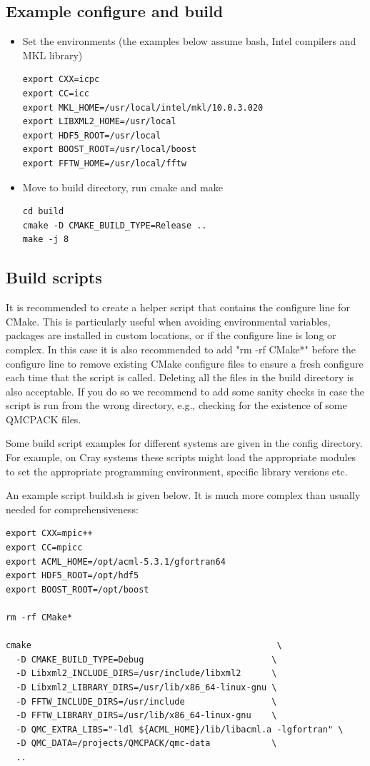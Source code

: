 \subsection{Example configure and build}
\begin{itemize}
\item Set the environments (the examples below assume bash, Intel compilers and MKL library)
\begin{verbatim}
export CXX=icpc
export CC=icc
export MKL_HOME=/usr/local/intel/mkl/10.0.3.020
export LIBXML2_HOME=/usr/local
export HDF5_ROOT=/usr/local
export BOOST_ROOT=/usr/local/boost
export FFTW_HOME=/usr/local/fftw
\end{verbatim}

\item Move to build directory, run cmake and make
\begin{verbatim}
cd build
cmake -D CMAKE_BUILD_TYPE=Release ..
make -j 8
\end{verbatim}
\end{itemize}

\subsection{Build scripts}
It is recommended to create a helper script that contains the
configure line for CMake.  This is particularly useful when avoiding
environmental variables, packages are installed in custom locations,
or if the configure line is long or complex.  In this case it is also
recommended to add "rm -rf CMake*" before the configure line to remove
existing CMake configure files to ensure a fresh configure each time
that the script is called. Deleting all the files in the build
directory is also acceptable. If you do so we recommend to add some sanity
checks in case the script is run from the wrong directory, e.g.,
checking for the existence of some QMCPACK files.

Some build script examples for different systems are given in the
config directory. For example, on Cray systems these scripts might
load the appropriate modules to set the appropriate programming
environment, specific library versions etc.

An example script build.sh is given below. It is much more complex
than usually needed for comprehensiveness:

\begin{verbatim}
export CXX=mpic++
export CC=mpicc
export ACML_HOME=/opt/acml-5.3.1/gfortran64
export HDF5_ROOT=/opt/hdf5
export BOOST_ROOT=/opt/boost

rm -rf CMake*

cmake                                                \
  -D CMAKE_BUILD_TYPE=Debug                         \
  -D Libxml2_INCLUDE_DIRS=/usr/include/libxml2      \
  -D Libxml2_LIBRARY_DIRS=/usr/lib/x86_64-linux-gnu \
  -D FFTW_INCLUDE_DIRS=/usr/include                 \
  -D FFTW_LIBRARY_DIRS=/usr/lib/x86_64-linux-gnu    \
  -D QMC_EXTRA_LIBS="-ldl ${ACML_HOME}/lib/libacml.a -lgfortran" \
  -D QMC_DATA=/projects/QMCPACK/qmc-data            \
  ..
\end{verbatim}

